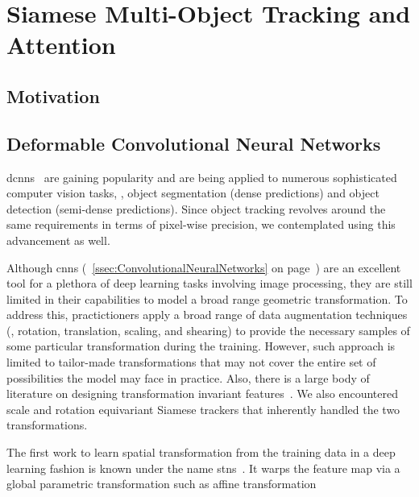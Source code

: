 \section{Siamese Multi-Object Tracking and Attention}
\label{sec:SiamMOTandAttention}

\subsection{Motivation}

\subsection{Deformable Convolutional Neural Networks}
\label{ssec:DeformableCNNS}

\Glspl{dcnn}~\cite{dai2017dcnn} are gaining popularity and are being applied to numerous sophisticated computer vision tasks, \egtext{}, object segmentation (dense predictions) and object detection (semi-dense predictions). Since object tracking revolves around the same requirements in terms of pixel-wise precision, we contemplated using this advancement as well.

Although \glspl{cnn} (\sectiontext{}~\ref{ssec:ConvolutionalNeuralNetworks} on page~\pageref{ssec:ConvolutionalNeuralNetworks}) are an excellent tool for a plethora of deep learning tasks involving image processing, they are still limited in their capabilities to model a broad range geometric transformation. To address this, practictioners apply a broad range of data augmentation techniques (\egtext{}, rotation, translation, scaling, and shearing) to provide the necessary samples of some particular transformation during the training. However, such approach is limited to tailor-made transformations that may not cover the entire set of possibilities the model may face in practice. Also, there is a large body of literature on designing transformation invariant features~\cite{lowe1999sift, rublee2011orb}. We also encountered scale and rotation equivariant Siamese trackers that inherently handled the two transformations.

The first work to learn spatial transformation from the training data in a deep learning fashion is known under the name \glspl{stn}~\cite{jaderberg2016stn}. It warps the feature map via a global parametric transformation such as affine transformation

